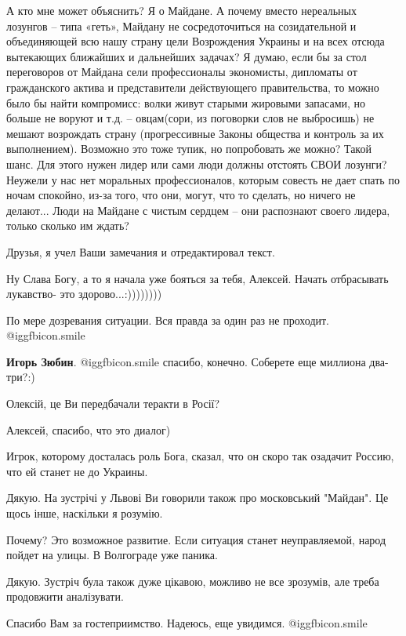 \begin{itemize}
А кто мне может объяснить? Я о Майдане. А почему вместо нереальных лозунгов –
типа «геть», Майдану не сосредоточиться на созидательной и объединяющей всю
нашу страну цели Возрождения Украины и на всех отсюда вытекающих ближайших и
дальнейших задачах? Я думаю, если бы за стол переговоров от Майдана сели
профессионалы экономисты, дипломаты от гражданского актива и представители
действующего правительства, то можно было бы найти компромисс: волки живут
старыми жировыми запасами, но больше не воруют и т.д. – овцам(сори, из
поговорки слов не выбросишь) не мешают возрождать страну (прогрессивные Законы
общества и контроль за их выполнением). Возможно это тоже тупик, но попробовать
же можно? Такой шанс. Для этого нужен лидер или сами люди должны отстоять СВОИ
лозунги? Неужели у нас нет моральных профессионалов, которым совесть не дает
спать по ночам спокойно, из-за того, что они, могут, что то сделать, но ничего
не делают... Люди на Майдане с чистым сердцем – они распознают своего лидера,
только сколько им ждать?

Друзья, я учел Ваши замечания и отредактировал текст.

Ну Слава Богу, а то я начала уже бояться за тебя, Алексей. Начать отбрасывать лукавство- это здорово...:))))))))

По мере дозревания ситуации. Вся правда за один раз не проходит. @igg{fbicon.smile} 

\textbf{Игорь Зюбин}.  @igg{fbicon.smile}  спасибо, конечно. Соберете еще миллиона два-три?:)

Олексій, це Ви передбачали теракти в Росії?

Алексей, спасибо, что это диалог)

Игрок, которому досталась роль Бога, сказал, что он скоро так озадачит Россию, что ей станет не до Украины.

Дякую. На зустрічі у Львові Ви говорили також про московський "Майдан". Це щось інше, наскільки я розумію.

Почему? Это возможное развитие. Если ситуация станет неуправляемой, народ пойдет на улицы. В Волгограде уже паника.

Дякую. Зустріч була також дуже цікавою, можливо не все зрозумів, але треба продовжити аналізувати.

Спасибо Вам за гостеприимство. Надеюсь, еще увидимся.  @igg{fbicon.smile} 


\end{itemize}
